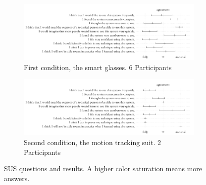 \begin{figure}[h]
    \centering
    \begin{subfigure}[b]{\textwidth}
        \centering
        \includegraphics[width=\textwidth]{figures/plots/sus-glasses.pdf}
        \caption{First condition, the smart glasses. 6 Participants}
        \label{fig:sus-glasses}    
    \end{subfigure}
    \begin{subfigure}[b]{\textwidth}
        \centering
        \includegraphics[width=\textwidth]{figures/plots/sus-mvn.pdf}
        \caption{Second condition, the motion tracking suit. 2 Participants}
        \label{fig:sus-mvn}
    \end{subfigure}
    \caption{SUS questions and results. A higher color saturation means more answers.}
    \label{fig:sus-results}
\end{figure}
